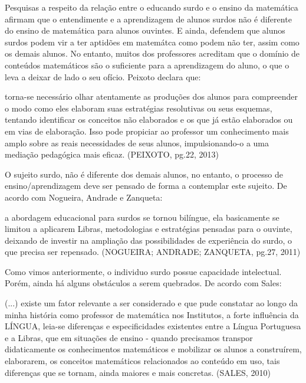 \documentclass[brasil]{abnt}
\begin{document}
	Pesquisas a respeito da relação entre o educando surdo e o ensino da matemática afirmam que o entendimente e a aprendizagem de alunos surdos não é diferente do ensino de matemática para alunos ouvintes. 
	E ainda, defendem que alunos surdos podem vir a ter aptidões em matemátca como podem não ter, assim como os demais alunos. No entanto, muitos dos professores acreditam que o domínio de conteúdos 
	matemáticos são o suficiente para a aprendizagem do aluno, o que o leva a deixar de lado o seu ofício. Peixoto declara que:
	
		\begin{citacao}[...] torna-se necessário olhar atentamente as produções dos alunos para compreender o modo como eles elaboram suas estratégias resolutivas ou seus esquemas, tentando identificar 
						os conceitos não elaborados e os que já estão elaborados ou em vias de elaboração. Isso pode propiciar ao professor um conhecimento mais amplo sobre as reais necessidades de seus 
						alunos, impulsionando-o a uma mediação pedagógica mais eficaz. (PEIXOTO, pg.22, 2013)
		\end{citacao}
	
	O sujeito surdo, não é diferente dos demais alunos, no entanto, o processo de ensino/aprendizagem deve ser pensado de forma a contemplar este sujeito. De acordo com Nogueira, Andrade e Zanqueta:

		\begin{citacao}[...] a abordagem educacional para surdos se tornou bilíngue, ela basicamente se limitou a aplicarem Libras, metodologias e estratégias pensadas para o ouvinte, deixando de investir 
						na ampliação das possibilidades de experiência do surdo, o que precisa ser repensado. (NOGUEIRA; ANDRADE; ZANQUETA, pg.27, 2011)
		\end{citacao}
	
	Como vimos anteriormente, o individuo surdo possue capacidade intelectual. Porém, ainda há alguns obstáculos a serem quebrados. De acordo com Sales:
			
			\begin{citacao} (...) existe um fator relevante a ser considerado e que pude constatar ao longo da minha história como professor de matemática nos Institutos, a forte influência da LÍNGUA, 
							leia-se diferenças e especificidades existentes entre a Língua Portuguesa e a Libras, que em situações de ensino - quando precisamos transpor didaticamente os conhecimentos 
							matemáticos e mobilizar os alunos a construírem, elaborarem, os conceitos matemáticos relacionados ao conteúdo em uso, tais diferenças que se tornam, ainda maiores e mais 
							concretas. (SALES, 2010) 
			\end{citacao}
	
\end{document}
